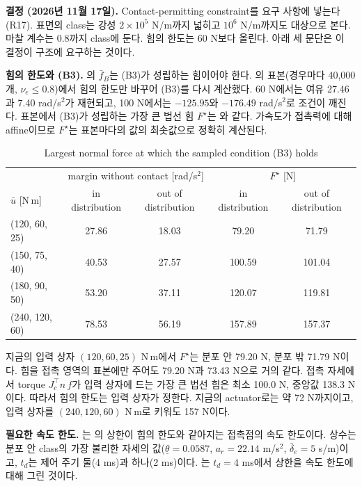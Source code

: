 \documentclass[11pt]{article}\usepackage[margin=1in]{geometry}\usepackage{amsmath,amssymb,amsthm,mathtools}\usepackage{graphicx}\graphicspath{{figures/}{../figures/}{figs/}{./}}\usepackage{enumitem}\usepackage{hyperref}\usepackage{cleveref}\usepackage{tikz}\usetikzlibrary{arrows.meta,positioning,calc,shapes.geometric}\usepackage{float}\usepackage{rotating}\usepackage[most]{tcolorbox}\usepackage{kotex}\usepackage{booktabs}\usepackage{longtable}\emergencystretch=1.6em\tolerance=2000 \crefname{assumption}{Assumption}{Assumptions}\Crefname{assumption}{Assumption}{Assumptions}\crefname{definition}{Definition}{Definitions}\Crefname{definition}{Definition}{Definitions}\crefname{proposition}{Proposition}{Propositions}\Crefname{proposition}{Proposition}{Propositions}\crefname{fact}{Fact}{Facts}\Crefname{fact}{Fact}{Facts} \newtheorem{assumption}{Assumption}\newtheorem{definition}{Definition}\newtheorem{lemma}{Lemma}\newtheorem{proposition}{Proposition}\newtheorem{theorem}{Theorem}\newtheorem{corollary}{Corollary}\newtheorem{fact}{Fact}\theoremstyle{remark}\newtheorem{remark}{Remark} \newcommand{\R}{\mathbb{R}}\newcommand{\xb}{\bar x}\newcommand{\Ab}{\bar A}\newcommand{\By}{\bar B_y}\newcommand{\U}{\mathcal U}\newcommand{\Z}{\mathcal Z}
\begin{document}
\textbf{결정 (2026년 11월 17일).} Contact-permitting constraint를 요구 사항에 넣는다 (R17). 표면의 class는 강성 $2\times10^5$ N/m까지 넓히고 $10^6$ N/m까지도 대상으로 본다. 마찰 계수는 0.8까지 class에 둔다. 힘의 한도는 60 N보다 올린다. 아래 세 문단은 이 결정이 구조에 요구하는 것이다.

\textbf{힘의 한도와 (B3).} 의 $\bar f_B$는 (B3)가 성립하는 힘이어야 한다. 의 표본(경우마다 40{,}000개, $\nu_e\le0.8$)에서 힘의 한도만 바꾸어 (B3)를 다시 계산했다. 60 N에서는 여유 27.46과 7.40 rad/s$^2$가 재현되고, 100 N에서는 $-125.95$와 $-176.49$ rad/s$^2$로 조건이 깨진다. 표본에서 (B3)가 성립하는 가장 큰 법선 힘 $F^\star$는 와 같다. 가속도가 접촉력에 대해 affine이므로 $F^\star$는 표본마다의 값의 최솟값으로 정확히 계산된다.

\begin{table}[H]
\centering\footnotesize
\caption{Largest normal force at which the sampled condition (B3) holds}
\label{tab:authority}
\begin{tabular}{lcccc}
\toprule
 & \multicolumn{2}{c}{margin without contact [rad/s$^2$]} & \multicolumn{2}{c}{$F^\star$ [N]} \\
$\bar u$ [N\,m] & in distribution & out of distribution & in distribution & out of distribution \\
\midrule
(120, 60, 25) & 27.86 & 18.03 & 79.20 & 71.79 \\
(150, 75, 40) & 40.53 & 27.57 & 100.59 & 101.04 \\
(180, 90, 50) & 53.20 & 37.11 & 120.07 & 119.81 \\
(240, 120, 60) & 78.53 & 56.19 & 157.89 & 157.37 \\
\bottomrule
\end{tabular}
\end{table}

지금의 입력 상자 $(120,60,25)$ N\,m에서 $F^\star$는 분포 안 79.20 N, 분포 밖 71.79 N이다. 힘을 접촉 영역의 표본에만 주어도 79.20 N과 73.43 N으로 거의 같다. 접촉 자세에서 torque $J_c^\top n\,f$가 입력 상자에 드는 가장 큰 법선 힘은 최소 100.0 N, 중앙값 138.3 N이다. 따라서 힘의 한도는 입력 상자가 정한다. 지금의 actuator로는 약 72 N까지이고, 입력 상자를 $(240,120,60)$ N\,m로 키워도 157 N이다.

\textbf{필요한 속도 한도.} 는 의 상한이 힘의 한도와 같아지는 접촉점의 속도 한도이다. 상수는 분포 안 class의 가장 불리한 자세의 값($\underline\theta=0.0587$, $a_r=22.14$ m/s$^2$, $\bar\delta_e=5$ s/m)이고, $t_d$는 제어 주기 둘(4 ms)과 하나(2 ms)이다. 는 $t_d=4$ ms에서 상한을 속도 한도에 대해 그린 것이다.
\end{document}
